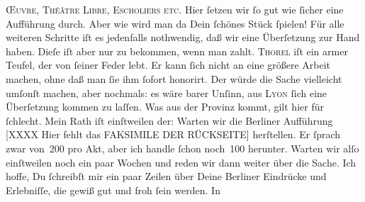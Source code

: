 \begin{ledgroupsized}[t]{13cm}
                  \textsc{Œuvre, Théâtre
                     Libre, Escholiers etc}.  Hier ſetzen wir ſo gut wie ſicher eine Aufführung
               durch. Aber wie wird man da Dein ſchönes Stück ſpielen!\pend
           \pstart
           Für alle weiteren Schritte iſt es  jedenfalls
               nothwendig, daß wir eine Überſetzung zur Hand haben. Dieſe iſt aber nur zu bekommen,
               wenn man zahlt. \textsc{Thorel} iſt ein armer  Teufel, {\pb}der von ſeiner Feder lebt. Er kann
               ſich nicht an eine größere Arbeit machen, ohne daß man ſie ihm ſofort honorirt.  Der \label{K_L02766-123v}\label{K_L02766-123h} würde die Sache vielleicht umſonſt
               machen, aber nochmals: es wäre barer Unſinn, aus \textsc{Lyon} ſich eine Überſetzung kommen zu laſſen.  Was
               aus der Provinz kommt, gilt hier für ſchlecht. Mein Rath iſt einſtweilen der: Warten
               wir die Berliner Aufführung \pend
           \pstart
           {[}XXXX Hier fehlt das FAKSIMILE DER RÜCKSEITE{]}\pend
           \pstart
           {\pb}herſtellen. Er ſprach zwar von 200 pro Akt, aber ich handle ſchon
               noch 100 herunter. Warten wir alſo einſtweilen noch ein paar Wochen\strikeout{\textcolor{gray}{n}} und reden wir dann weiter über die Sache.\pend
           \pstart
           Ich hoffe, Du ſchreibſt mir ein paar Zeilen über Deine Berliner Eindrücke und Erlebniſſe, die gewiß gut und froh ſein werden. In

\end{ledgroupsized}
